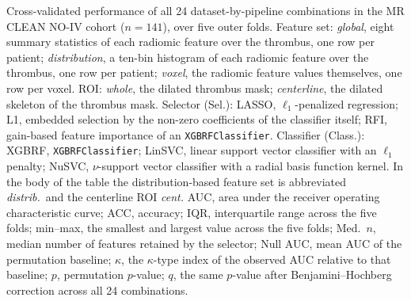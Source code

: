 \begin{table}[htbp]
\centering
\caption{Cross-validated performance of all 24 dataset-by-pipeline combinations in the MR CLEAN NO-IV cohort ($n = 141$), over five outer folds. Feature set: \emph{global}, eight summary statistics of each radiomic feature over the thrombus, one row per patient; \emph{distribution}, a ten-bin histogram of each radiomic feature over the thrombus, one row per patient; \emph{voxel}, the radiomic feature values themselves, one row per voxel. ROI: \emph{whole}, the dilated thrombus mask; \emph{centerline}, the dilated skeleton of the thrombus mask. Selector (Sel.): LASSO, $\ell_1$-penalized regression; L1, embedded selection by the non-zero coefficients of the classifier itself; RFI, gain-based feature importance of an \texttt{XGBRFClassifier}. Classifier (Class.): XGBRF, \texttt{XGBRFClassifier}; LinSVC, linear support vector classifier with an $\ell_1$ penalty; NuSVC, $\nu$-support vector classifier with a radial basis function kernel. In the body of the table the distribution-based feature set is abbreviated \emph{distrib.}\ and the centerline ROI \emph{cent.} AUC, area under the receiver operating characteristic curve; ACC, accuracy; IQR, interquartile range across the five folds; min--max, the smallest and largest value across the five folds; Med.\ $n$, median number of features retained by the selector; Null AUC, mean AUC of the permutation baseline; $\kappa$, the $\kappa$-type index of the observed AUC relative to that baseline; $p$, permutation $p$-value; $q$, the same $p$-value after Benjamini--Hochberg correction across all 24 combinations.}
\label{tab:cv-performance}
\smallskip

\end{table}

